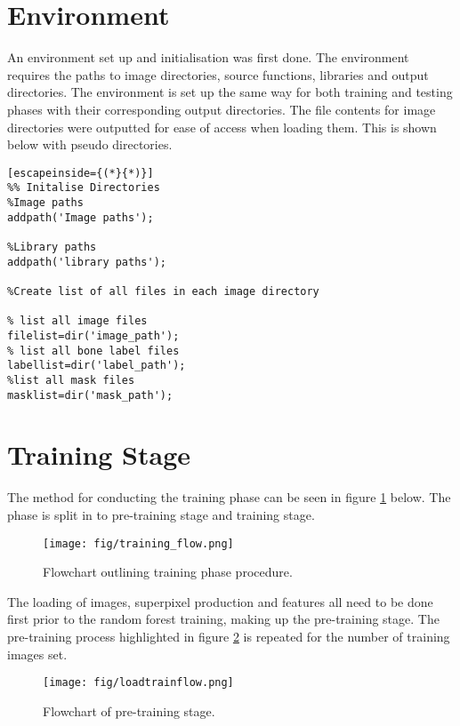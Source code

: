 \section{Environment}
An environment set up and initialisation was first done. The environment requires the paths to image directories, source functions, libraries and output directories. The environment is set up the same way for both training and testing phases with their corresponding output directories. The file contents for image directories were outputted for ease of access when loading them.  This is shown below with pseudo directories.

\begin{lstlisting}[escapeinside={(*}{*)}]
%% Initalise Directories 
%Image paths
addpath('Image paths');

%Library paths
addpath('library paths');

%Create list of all files in each image directory

% list all image files
filelist=dir('image_path'); 
% list all bone label files
labellist=dir('label_path');
%list all mask files 
masklist=dir('mask_path'); 
\end{lstlisting}

\section{Training Stage} 
\label{sect: trainstage}
The method for conducting the training phase can be seen in figure \ref{fig: trainflow} below. The phase is split in to pre-training stage and training stage.

\begin{figure}[H]
\centering
\texttt{[image: fig/training\_flow.png]}
\label{fig: trainflow}
\caption{Flowchart outlining training phase procedure.}
\end{figure}

The loading of images, superpixel production and features all need to be done first prior to the random forest training, making up the pre-training stage. The pre-training process highlighted in figure \ref{fig: flowtrainload} is repeated for the number of training images set. 

\begin{figure}[H]

\texttt{[image: fig/loadtrainflow.png]}
\label{fig: flowtrainload}
\caption{Flowchart of pre-training stage.}
\end{figure}


